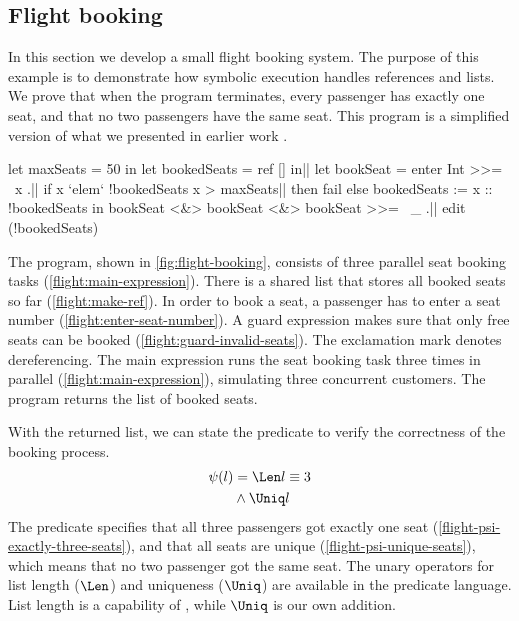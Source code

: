 \subsection{Flight booking}

In this section we develop a small flight booking system.
The purpose of this example is to demonstrate how symbolic execution handles references and lists.
We prove that when the program terminates, every passenger has exactly one seat, and that no two passengers have the same seat.
This program is a simplified version of what we presented in earlier work \cite{Steenvoorden2019}.

\begin{TASK}[float=h
            ,numbers=right
            ,caption=Flight booking.
            ,label=fig:flight-booking
            ]
  let maxSeats = 50 in
  let bookedSeats = ref [] in|\label{flight:make-ref}|
  let bookSeat = enter Int >>= \ x .|\label{flight:enter-seat-number}|
    if x `elem` !bookedSeats \/ x > maxSeats|\label{flight:guard-invalid-seats}|
      then fail else bookedSeats := x :: !bookedSeats in
  bookSeat <&> bookSeat <&> bookSeat >>= \ _ .|\label{flight:main-expression}|
  edit (!bookedSeats)
\end{TASK}

The program, shown in \cref{fig:flight-booking}, consists of three parallel seat booking tasks (\cref{flight:main-expression}).
There is a shared list that stores all booked seats so far (\cref{flight:make-ref}).
In order to book a seat, a passenger has to enter a seat number (\cref{flight:enter-seat-number}).
A guard expression makes sure that only free seats can be booked (\cref{flight:guard-invalid-seats}).
The exclamation mark denotes dereferencing.
The main expression runs the seat booking task three times in parallel (\cref{flight:main-expression}), simulating three concurrent customers.
The program returns the list of booked seats.

With the returned list, we can state the predicate to verify the correctness of the booking process.
\setcounter{equation}{0}
\begin{align}
\psi(l)
   & =      \Len l \equiv 3 \label{flight-psi-exactly-three-seats}
\\ & \wedge \Uniq l \label{flight-psi-unique-seats}
\end{align}
The predicate specifies that all three passengers got exactly one seat (\ref{flight-psi-exactly-three-seats}), and that all seats are unique (\ref{flight-psi-unique-seats}), which means that no two passenger got the same seat.
The unary operators for list length ($\Len$) and uniqueness ($\Uniq$) are available in the predicate language.
List length is a capability of \SMTLIB, while $\Uniq$ is our own addition.

